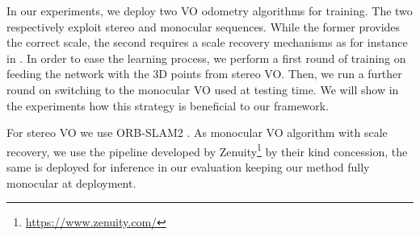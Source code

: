 \documentclass[10pt,twocolumn,letterpaper]{article}
\begin{document}
In our experiments, we deploy two VO odometry algorithms for training. The two respectively exploit stereo and monocular sequences. While the former provides the correct scale, the second requires a scale recovery mechanisms as for instance in \cite{Wang_2018_ICRA,fanani_2017}. In order to ease the learning process, we perform a first round of training on  feeding the network with the 3D points from stereo VO. Then, we run a further round on  switching to the monocular VO used at testing time.
We will show in the experiments how this strategy is beneficial to our framework.

For stereo VO we use ORB-SLAM2 \cite{orbslam2}. As monocular VO algorithm with scale recovery, we use the pipeline developed by Zenuity\footnote{\url{https://www.zenuity.com/}} by their kind concession, the same is deployed for inference in our evaluation keeping our method fully monocular at deployment.
\end{document}
